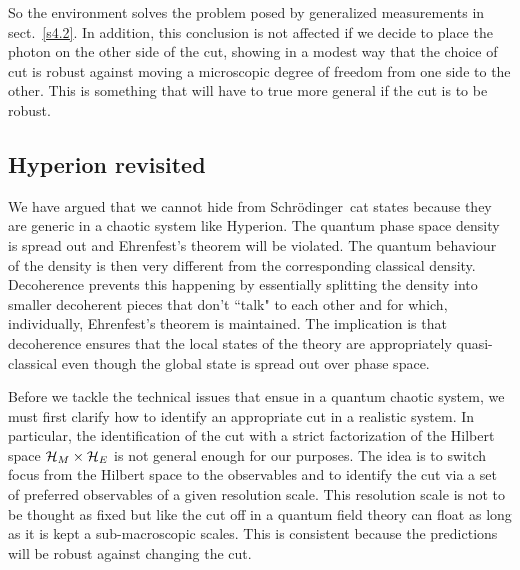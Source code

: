 \documentclass[12pt]{article}
\theoremstyle{plain}
\theoremstyle{definition}
\theoremstyle{remark}
\def\SCH{Schr\"odinger\ }
\def\BH{{\cal H}}
\begin{document}
So the environment solves the problem posed by generalized measurements in sect.~\ref{s4.2}. In addition, this conclusion is not affected if we decide to place the photon on the other side of the cut, showing in a modest way that the choice of cut is robust against moving a microscopic degree of freedom from one side to the other. This is something that will have to true more general if the cut is to be robust.

\subsection{Hyperion revisited}
  
We have argued that we cannot hide from \SCH cat states because they are generic in a chaotic system like Hyperion. The quantum phase space density is spread out and Ehrenfest's theorem will be violated. The quantum behaviour of the density is then very different from the corresponding classical density. Decoherence prevents this happening by essentially splitting the density into smaller decoherent pieces that don't ``talk" to each other and for which, individually, Ehrenfest's theorem is maintained. The implication is that decoherence ensures that the local states of the theory are appropriately quasi-classical even though the global state is spread out over phase space.

Before we tackle the technical issues that ensue in a quantum chaotic system, we must first clarify how to 
identify an appropriate cut in a realistic system. In particular, the identification of the cut with a strict factorization of the Hilbert space $\BH_M\times\BH_E$ is not general enough for our purposes.
The idea is to switch focus from the Hilbert space to the observables and to identify the cut via a set of preferred observables of a given resolution scale. This resolution scale is not to be thought as fixed but like the cut off in a quantum field theory can float as long as it is kept a sub-macroscopic scales. This is consistent because the predictions will be robust against changing the cut.
\end{document}
